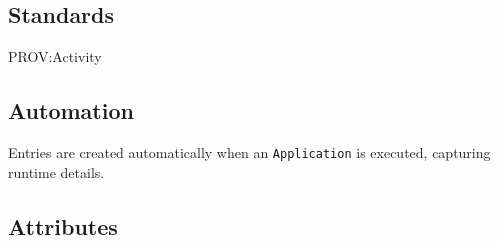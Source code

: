 \documentclass[
]{article}
\begin{document}
\subsection{Standards}\label{standards-25}

PROV:Activity

\subsection{Automation}\label{automation-25}

Entries are created automatically when an \texttt{Application} is
executed, capturing runtime details.

\subsection{Attributes}\label{attributes-22}
\end{document}
